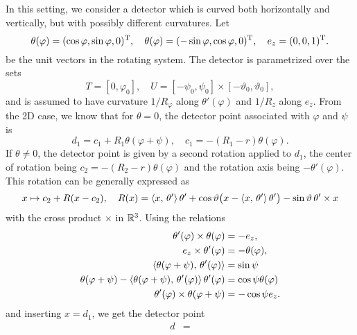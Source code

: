 \documentclass{amsart}
\renewcommand*{\phi}{\varphi}
\begin{document}
\begin{example}
 In this setting, we consider a detector which is curved both horizontally and vertically, but with possibly different curvatures. Let
 \begin{equation}
  \label{eq:conecurved_unitvecs}
  \theta(\phi) = \TRANSP{(\cos\phi, \sin\phi, 0)}, \quad \theta(\phi) = \TRANSP{(-\sin\phi, \cos\phi, 0)}, \quad e_z = \TRANSP{(0, 0, 1)}.
 \end{equation}
 be the unit vectors in the rotating system. The detector is parametrized over the sets
 \begin{equation}
  \label{eq:conecurved_params}
  T = [0, \phi_0],\quad U = [-\psi_0, \psi_0] \times [-\vartheta_0, \vartheta_0],
 \end{equation}
 and is assumed to have curvature $1/R_\phi$ along $\theta'(\phi)$ and $1/R_z$ along $e_z$. From the 2D case, we know that for $\theta=0$, 
 the detector point associated with $\phi$ and $\psi$ is
 \begin{equation*}
  d_1 = c_1 + R_1 \theta(\phi + \psi), \quad c_1 = -(R_1 - r) \theta(\phi).
 \end{equation*}
 If $\theta \neq 0$, the detector point is given by a second rotation applied to $d_1$, the center of rotation being $c_2 = -(R_2 - r) 
 \theta(\phi)$ and the rotation axis being $-\theta'(\phi)$. This rotation can be generally expressed as
 \begin{equation*}
  x \mapsto c_2 + R(x - c_2), \quad R(x) = \langle x,\,\theta'\rangle\, \theta' + \cos\vartheta \big(x - \langle x,\,\theta'\rangle\, \theta'\big) 
  - \sin\vartheta\, \theta' \times x
 \end{equation*}
 with the cross product $\times$ in ${\mathbb{R}}^3$. Using the relations
 \begin{align*}
  \theta'(\phi) \times \theta(\phi) &= -e_z, \\
  e_z \times \theta'(\phi) &= -\theta(\phi), \\
  \INNER{\theta(\phi + \psi)}{\theta'(\phi)} &= \sin\psi \\
  \theta(\phi + \psi) - \INNER{\theta(\phi + \psi)}{\theta'(\phi)}\, \theta'(\phi) &= \cos\psi \theta(\phi)\\
  \theta'(\phi) \times \theta(\phi + \psi) &= -\cos\psi e_z.
 \end{align*}
 and inserting $x = d_1$, we get the detector point
 \begin{align*}
  d
  &= 
 \end{align*}
 
\end{example}
\end{document}
